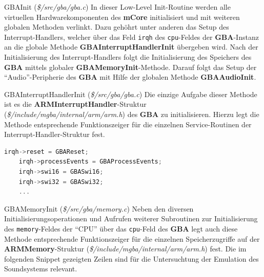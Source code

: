 \documentclass[11pt,a4paper]{scrartcl}
\begin{document}
\vspace{5mm}
\large GBAInit \normalsize(\textit{\$/src/gba/gba.c})
\vspace{2mm}\newline
In dieser Low-Level Init-Routine werden alle virtuellen Hardwarekomponenten des \textbf{mCore} initialisiert und mit weiteren globalen Methoden verlinkt. Dazu geh\"ohrt unter anderen das Setup des Interrupt-Handlers, welcher \"uber das Feld \verb|irqh| des \verb|cpu|-Feldes der \textbf{GBA}-Instanz an die globale Methode \textbf{GBAInterruptHandlerInit} \"ubergeben wird. Nach der Initialisierung des Interrupt-Handlers folgt die Initialisierung des Speichers des \textbf{GBA} mittels globaler \textbf{GBAMemoryInit}-Methode. Darauf folgt das Setup der \enquote{Audio}-Peripherie des \textbf{GBA} mit Hilfe der globalen Methode \textbf{GBAAudioInit}.

\vspace{5mm}
\large GBAInterruptHandlerInit \normalsize(\textit{\$/src/gba/gba.c})
\vspace{2mm}\newline
Die einzige Aufgabe dieser Methode ist es die \textbf{ARMInterruptHandler}-Struktur (\textit{\$/include/mgba/internal/arm/arm.h}) des \textbf{GBA} zu initialisieren. Hierzu legt die Methode entsprechende Funktionszeiger f\"ur die einzelnen Service-Routinen der Interrupt-Handler-Struktur fest.

\vspace{5mm}
\begin{lstlisting}[language=C++, caption={Ausschnitt aus der \textbf{GBAInterruptHandlerInit}-Methode}, label={list:GBAInterruptHandlerInit}]
    irqh->reset = GBAReset;
    irqh->processEvents = GBAProcessEvents;
    irqh->swi16 = GBASwi16;
    irqh->swi32 = GBASwi32;
    ...
\end{lstlisting}

\vspace{5mm}
\large GBAMemoryInit \normalsize(\textit{\$/src/gba/memory.c})
\vspace{2mm}\newline
Neben den diversen Initialisierungsoperationen und Aufrufen weiterer Subroutinen zur Initialisierung des \verb|memory|-Feldes der \enquote{CPU} \"uber das \verb|cpu|-Feld des \textbf{GBA} legt auch diese Methode entsprechende Funktionszeiger f\"ur die einzelnen Speicherzugriffe auf der \textbf{ARMMemory}-Struktur (\textit{\$/include/mgba/internal/arm/arm.h}) fest. Die im folgenden Snippet gezeigten Zeilen sind f\"ur die Untersuchtung der Emulation des Soundsystems relevant.
\end{document}
